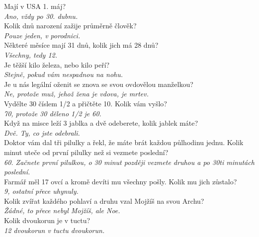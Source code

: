 \begin{multicols}{2}
\noindent
Mají v USA 1. máj?\\[1 mm]
{\sl Ano, vždy po 30. dubnu.}\\

\noindent
Kolik dnů narození zažije průměrně člověk?\\[1 mm]
{\sl Pouze jeden, v porodnici.}\\

\noindent
Některé měsíce mají 31 dnů, kolik jich má 28 dnů?\\[1 mm]
{\sl Všechny, tedy 12.}\\

\noindent
Je těžší kilo železa, nebo kilo peří?\\[1 mm]
{\sl Stejně, pokud vám nespadnou na nohu.}\\

\noindent
Je u nás legální oženit se znova se svou ovdovělou
manželkou?\\[1 mm]
{\sl Ne, protože muž, jehož žena je vdova, je mrtev.}\\

\noindent
Vydělte 30 číslem 1/2 a přičtěte 10. Kolik vám vyšlo?\\[1 mm]
{\sl 70, protože 30 děleno 1/2 je 60.}\\

\noindent
Když na misce leží 3 jablka a dvě odeberete, kolik jablek máte?\\[1 mm]
{\sl Dvě. Ty, co jste odebrali.}\\

\noindent
Doktor vám dal tři pilulky a řekl, že máte brát každou půlhodinu
jednu. Kolik minut uteče od první pilulky než si vezmete poslední?\\[1 mm]
{\sl 60. Začnete první pilulkou, o 30 minut později vezmete druhou
a po 30ti minutách poslední.}\\

\noindent
Farmář měl 17 ovcí a kromě devíti mu všechny pošly. Kolik mu
jich zůstalo?\\[1 mm]
{\sl 9, ostatní přece uhynuly.}\\

\noindent
Kolik zvířat každého pohlaví a druhu vzal Mojžíš na svou Archu?\\[1 mm]
{\sl Žádné, to přece nebyl Mojžíš, ale Noe.}\\

\noindent
Kolik dvoukorun je v tuctu?\\[1 mm]
{\sl 12 dvoukorun v tuctu dvoukorun.}\\


\end{multicols}
